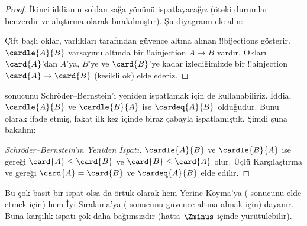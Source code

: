\documentclass[../../../include/open-logic-section]{subfiles}
\begin{document}
\begin{proof}
İkinci iddianın soldan sağa yönünü ispatlayacağız (öteki durumlar benzerdir
ve alıştırma olarak bırakılmıştır). Şu diyagramı ele alın:
\begin{center}
\end{center}
Çift başlı oklar, varlıkları  tarafından güvence
altına alınan !!{bijection}s gösterir. $\cardle{A}{B}$ varsayımı altında
bir !!a{injection} $A\to B$ vardır. Okları $\card{A}$'dan $A$'ya,
$B$'ye ve $\card{B}$'ye kadar izlediğimizde bir !!a{injection}
$\card{A}\to\card{B}$ (kesikli ok) elde ederiz.
\end{proof}\noindent
{} sonucunu Schröder--Bernstein'ı yeniden
ispatlamak için de kullanabiliriz. İddia, $\cardle{A}{B}$ ve
$\cardle{B}{A}$ ise $\cardeq{A}{B}$ olduğudur. Bunu
 olarak ifade etmiş, fakat ilk
kez  içinde biraz çabayla
ispatlamıştık. Şimdi şuna bakalım:

\begin{proof}[Schröder--Bernstein'ın Yeniden İspatı]
$\cardle{A}{B}$ ve $\cardle{B}{A}$ ise
 gereği $\card{A}\leq\card{B}$ ve
$\card{B}\leq\card{A}$ olur. Üçlü Karşılaştırma ve
 gereği $\card{A}=\card{B}$ ve
$\cardeq{A}{B}$ elde edilir.
\end{proof}
\noindent
Bu çok basit bir ispat olsa da örtük olarak hem Yerine Koyma'ya
( sonucunu elde etmek
için) hem İyi Sıralama'ya ( sonucunu
güvence altına almak için) dayanır. Buna karşılık
 ispatı çok daha bağımsızdır (hatta
$\Zminus$ içinde yürütülebilir).
\end{document}
